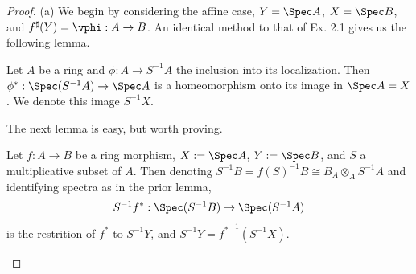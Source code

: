 \documentclass[12pt]{amsart}
\begin{document}
\begin{proof}
  (a) We begin by considering the affine case, $Y=\Spec A$, $X=\Spec B$, and $f^\sharp(Y)=\vphi:A\to B$.
  An identical method to that of Ex. 2.1 gives us the following lemma.
  \begin{lemma}
    Let $A$ be a ring and $\phi:A\to S^{-1}A$ the inclusion into its localization.
    Then $\phi^*:\Spec (S^{-1}A)\to \Spec A$ is a homeomorphism onto its image in $\Spec A = X$.
    We denote this image $S^{-1} X$.
  \end{lemma}
  The next lemma is easy, but worth proving.
  \begin{lemma}
    Let $f:A\to B$ be a ring morphism, $X:= \Spec A$, $Y:=\Spec B$, and $S$ a multiplicative subset of $A$.
    Then denoting $S^{-1}B =f(S)^{-1}B\cong B_A\otimes_A S^{-1}A$ and identifying spectra as in the prior lemma, 
    \[
      S^{-1}f^*:\Spec (S^{-1}B)\to \Spec(S^{-1}A)
    \]
    is the restrition of $f^*$ to $S^{-1}Y$, and $S^{-1}Y={f^*}^{-1}(S^{-1}X)$.
  \end{lemma}


\end{proof}
\end{document}
